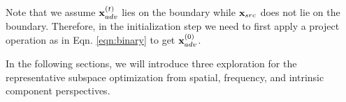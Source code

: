 Note that we assume ${\bf x}_{adv}^{(t)}$ lies on the boundary while ${\bf x}_{src}$ does not lie on the boundary. Therefore, in the initialization step we need to first apply a project operation as in Eqn. \ref{eqn:binary} to get ${\bf x}_{adv}^{(0)}$.

In the following sections, we will introduce three exploration for the representative subspace optimization from spatial, frequency, and intrinsic component perspectives.


